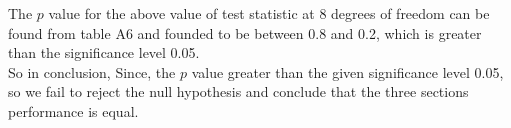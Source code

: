 \documentclass[12pt]{article}
\begin{document}
The $p$ value for the above value of test statistic at 8 degrees of freedom can be found from table A6 and founded to be between 0.8 and 0.2, which is greater than the significance level 0.05. \\

So in conclusion, Since, the $p$ value greater than the given significance level 0.05, so we fail to reject the null hypothesis and conclude that the three sections performance is equal.
\end{document}
